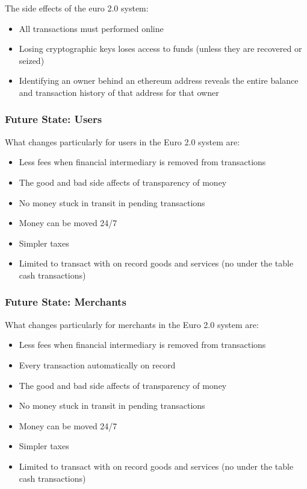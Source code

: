 \documentclass[12pt]{article} %
\begin{document}
{The side effects of the euro 2.0 system:

\begin{itemize}
	\item All transactions must performed online
	\item Losing cryptographic keys loses access to funds (unless they are recovered or seized)
	\item Identifying an owner behind an ethereum address reveals the entire balance and transaction history of that address for that owner
\end{itemize}

\subsubsection{Future State: Users} \label{sssec:4.4:users}

What changes particularly for users in the Euro 2.0 system are:

\begin{itemize}
	\item Less fees when financial intermediary is removed from transactions
	\item The good and bad side affects of transparency of money
	\item No money stuck in transit in pending transactions
	\item Money can be moved 24/7
	\item Simpler taxes
	\item Limited to transact with on record goods and services (no under the table cash transactions)
\end{itemize}

\subsubsection{Future State: Merchants} \label{sssec:4.4:merchants}

What changes particularly for merchants in the Euro 2.0 system are:

\begin{itemize}
	\item Less fees when financial intermediary is removed from transactions
	\item Every transaction automatically on record
	\item The good and bad side affects of transparency of money
	\item No money stuck in transit in pending transactions
	\item Money can be moved 24/7
	\item Simpler taxes
	\item Limited to transact with on record goods and services (no under the table cash transactions)
\end{itemize}

}
\end{document}
